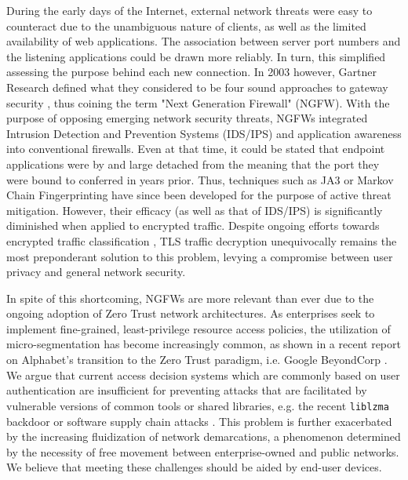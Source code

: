 During the early days of the Internet, external network threats were easy to counteract due to the unambiguous nature of clients, as well as the limited availability of web applications. The association between server port numbers and the listening applications could be drawn more reliably. In turn, this simplified assessing the purpose behind each new connection. In 2003 however, Gartner Research defined what they considered to be four sound approaches to gateway security \cite{stiennon2003paths}, thus coining the term "Next Generation Firewall" (NGFW). With the purpose of opposing emerging network security threats, NGFWs integrated Intrusion Detection and Prevention Systems (IDS/IPS) and application awareness \cite{heino2022study} into conventional firewalls. Even at that time, it could be stated that endpoint applications were by and large detached from the meaning that the port they were bound to conferred in years prior. Thus, techniques such as JA3 or Markov Chain Fingerprinting \cite{gancheva2020tls} have since been developed for the purpose of active threat mitigation. However, their efficacy (as well as that of IDS/IPS) is significantly diminished when applied to encrypted traffic. Despite ongoing efforts towards encrypted traffic classification \cite{akbari2021look,yun2022encrypted,zhang2019stnn}, TLS traffic decryption \cite{radivilova2018decrypting} unequivocally remains the most preponderant solution to this problem, levying a compromise between user privacy and general network security.

In spite of this shortcoming, NGFWs are more relevant than ever due to the ongoing adoption of Zero Trust \cite{stafford2020zero} network architectures.
As enterprises seek to implement fine-grained, least-privilege resource access policies, the utilization of micro-segmentation \cite{basta2022towards} has become increasingly common, as shown in a recent report \cite{gonccalves2023beyondcorp} on Alphabet's transition to the Zero Trust paradigm, i.e. Google BeyondCorp \cite{ward2014beyondcorp,osborn2016beyondcorp}. We argue that current access decision systems which are commonly based on user authentication are insufficient for preventing attacks that are facilitated by vulnerable versions of common tools or shared libraries, e.g. the recent \texttt{liblzma} backdoor or software supply chain attacks \cite{ohm2020backstabber}. This problem is further exacerbated by the increasing fluidization of network demarcations, a phenomenon determined by the necessity of free movement between enterprise-owned and public networks. We believe that meeting these challenges should be aided by end-user devices.

